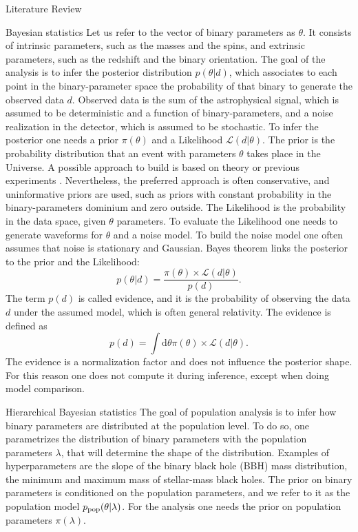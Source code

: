 \documentclass[a4paper, 12pt, twoside, openright, titlepage]{book}
\begin{document}
\begin{chapter}{Literature Review}
\begin{section}{Bayesian statistics}
Let us refer to the vector of binary parameters as $\theta$. It consists of intrinsic parameters, such as the masses and the spins, and extrinsic parameters, such as the redshift and the binary orientation.
The goal of the analysis is to infer the posterior distribution $p(\theta|d)$, which associates to each point in the binary-parameter space the probability of that binary to generate the observed data $d$. 
Observed data is the sum of the astrophysical signal, which is assumed to be deterministic and a function of binary-parameters, and a noise realization in the detector, which is assumed to be stochastic.
To infer the posterior one needs a prior $\pi(\theta)$ and a Likelihood $\mathcal{L}(d|\theta)$.
The prior is the probability distribution that an event with parameters $\theta$ takes place in the Universe. 
A possible approach to build is based on theory or previous experiments .
Nevertheless, the preferred approach is often conservative, and uninformative priors are used, such as priors with constant probability in the binary-parameters dominium and zero outside.
The Likelihood is the probability in the data space, given $\theta$ parameters.
To evaluate the Likelihood one needs to generate waveforms for $\theta$ and a noise model.
To build the noise model one often assumes that noise is stationary and Gaussian.
Bayes theorem links the posterior to the prior and the Likelihood:
\begin{equation}
\label{eq: post}
p(\theta|d) = \frac{ \pi(\theta) \times \mathcal{L}(d|\theta)}{p(d)}.
\end{equation}
The term $p(d)$ is called evidence, and it is the probability of observing the data $d$ under the assumed model, which is often general relativity.
The evidence is defined as
\begin{equation}
p(d) = \int\textrm{d}\theta \pi(\theta) \times \mathcal{L}(d|\theta).
\end{equation}
The evidence is a normalization factor and does not influence the posterior shape.
For this reason one does not compute it during inference, except when doing model comparison.


\end{section}


\begin{section}{Hierarchical Bayesian statistics}
The goal of population analysis is to infer how binary parameters are distributed at the population level. 
To do so, one parametrizes the distribution of binary parameters with the population parameters $\lambda$, that will determine the shape of the distribution. 
Examples of hyperparameters are the slope of the binary black hole (BBH) mass distribution, the minimum and maximum mass of stellar-mass black holes.
The prior on binary parameters is conditioned on the population parameters, and we refer to it as the population model $p_{\rm pop}(\theta|\lambda)$.
For the analysis one needs the prior on population parameters $\pi(\lambda)$.


\end{section}
\end{chapter}
\end{document}
